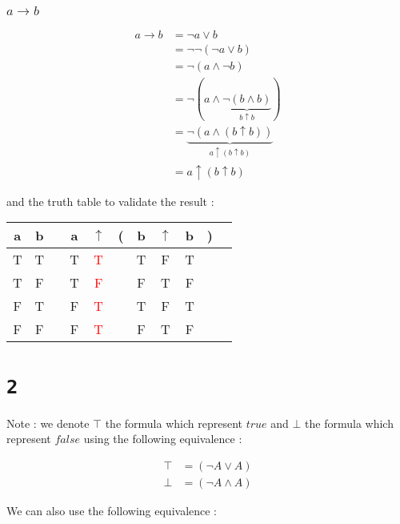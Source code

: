 \documentclass[a4paper,11pt]{report}
\begin{document}
\subsubsection*{$a \rightarrow b$}

\begin{align*}
  a \rightarrow b &= \neg a \vee b\\
                  &= \neg \neg (\neg a \vee b)\\
                  &= \neg (a \wedge \neg b)\\
                  &= \neg (a \wedge \underbrace{\neg (b \wedge b)}_{b \uparrow b})\\
                  &= \underbrace{\neg (a \wedge (b \uparrow b))}_{a \uparrow (b \uparrow b)}\\
                  &= a \uparrow (b \uparrow b)
\end{align*}

and the truth table to validate the result :

\begin{center}
  \begin{tabular}{@{ }c@{ }@{ }c | c@{ }@{ }c@{ }@{ }c@{ }@{}c@{}@{ }c@{ }@{ }c@{ }@{ }c@{ }@{}c@{}@{ }c}
    a & b &  & a & $\uparrow$ & ( & b & $\uparrow$ & b & ) & \\
    \hline 
    T & T &  & T & \textcolor{red}{T} &  & T & F & T &  & \\
    T & F &  & T & \textcolor{red}{F} &  & F & T & F &  & \\
    F & T &  & F & \textcolor{red}{T} &  & T & F & T &  & \\
    F & F &  & F & \textcolor{red}{T} &  & F & T & F &  & \\
  \end{tabular}
\end{center}

\section*{\texttt{2}}

Note : we denote $\top$ the formula which represent $true$ and $\bot$ the
formula which represent $false$ using the following equivalence :

\begin{align*}
  \top &= (\neg A \vee A) \\
  \bot &= (\neg A \wedge A)
\end{align*}

We can also use the following equivalence :
\end{document}
